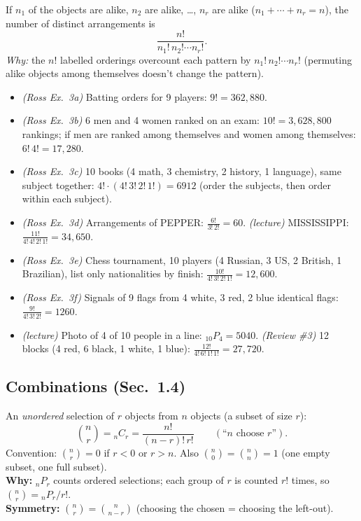 \documentclass[11pt]{article}
\let\oldsubsection\subsection
\renewcommand{\subsection}{\Needspace{14\baselineskip}\oldsubsection}
\newcommand{\nCr}[2]{\binom{#1}{#2}}
\newcommand{\nPr}[2]{{}_{#1}P_{#2}}
\begin{document}
\begin{thmbox}
If $n_1$ of the objects are alike, $n_2$ are alike, \dots, $n_r$ are alike ($n_1+\cdots+n_r=n$), the number of distinct arrangements is
\[ \frac{n!}{n_1!\,n_2!\cdots n_r!}. \]
\emph{Why:} the $n!$ labelled orderings overcount each pattern by $n_1!\,n_2!\cdots n_r!$ (permuting alike objects among themselves doesn't change the pattern).
\end{thmbox}

\begin{exbox}[Examples]
\begin{itemize}
\item \emph{(Ross Ex.\ 3a)} Batting orders for 9 players: $9!=362{,}880$.
\item \emph{(Ross Ex.\ 3b)} 6 men and 4 women ranked on an exam: $10!=3{,}628{,}800$ rankings; if men are ranked among themselves and women among themselves: $6!\,4!=17{,}280$.
\item \emph{(Ross Ex.\ 3c)} 10 books (4 math, 3 chemistry, 2 history, 1 language), same subject together: $4!\cdot(4!\,3!\,2!\,1!)=6912$ (order the subjects, then order within each subject).
\item \emph{(Ross Ex.\ 3d)} Arrangements of PEPPER: $\frac{6!}{3!\,2!}=60$. \emph{(lecture)} MISSISSIPPI: $\frac{11!}{4!\,4!\,2!\,1!}=34{,}650$.
\item \emph{(Ross Ex.\ 3e)} Chess tournament, 10 players (4 Russian, 3 US, 2 British, 1 Brazilian), list only nationalities by finish: $\frac{10!}{4!\,3!\,2!\,1!}=12{,}600$.
\item \emph{(Ross Ex.\ 3f)} Signals of 9 flags from 4 white, 3 red, 2 blue identical flags: $\frac{9!}{4!\,3!\,2!}=1260$.
\item \emph{(lecture)} Photo of 4 of 10 people in a line: $\nPr{10}{4}=5040$. \emph{(Review \#3)} 12 blocks (4 red, 6 black, 1 white, 1 blue): $\frac{12!}{4!\,6!\,1!\,1!}=27{,}720$.
\end{itemize}
\end{exbox}

\subsection{Combinations (Sec.\ 1.4)}

\begin{defbox}[Combination]
An \emph{unordered} selection of $r$ objects from $n$ objects (a subset of size $r$):
\[ \nCr{n}{r} = {}_nC_r = \frac{n!}{(n-r)!\,r!}\qquad(\text{``$n$ choose $r$''}). \]
Convention: $\nCr nr=0$ if $r<0$ or $r>n$. Also $\nCr n0=\nCr nn=1$ (one empty subset, one full subset).\\
\textbf{Why:} $\nPr nr$ counts ordered selections; each group of $r$ is counted $r!$ times, so $\nCr nr=\nPr nr/r!$.\\
\textbf{Symmetry:} $\nCr nr=\nCr n{n-r}$ (choosing the chosen = choosing the left-out).
\end{defbox}
\end{document}
